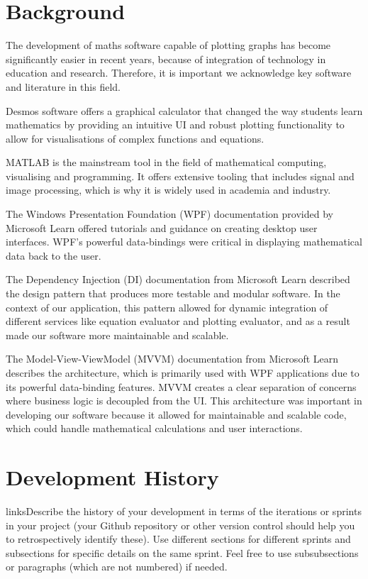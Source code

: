 \documentclass[a4paper, oneside, 11pt]{report}
\begin{document}
\chapter{Background}
The development of maths software capable of plotting graphs has become significantly easier in recent years, because of integration of technology in education and research. Therefore, it is important we acknowledge key software and literature in this field.

Desmos\cite{Desmos:2023} software offers a graphical calculator that changed the way students learn mathematics by providing an intuitive UI and robust plotting functionality to allow for visualisations of complex functions and equations.

MATLAB\cite{Matlab:2023} is the mainstream tool in the field of mathematical computing, visualising and programming. It offers extensive tooling that includes signal and image processing, which is why it is widely used in academia and industry.

The Windows Presentation Foundation (WPF)\cite{WPF:2023} documentation provided by Microsoft Learn offered tutorials and guidance on creating desktop user interfaces. WPF’s powerful data-bindings were critical in displaying mathematical data back to the user.

The Dependency Injection (DI) \cite{DI:2023} documentation from Microsoft Learn described the design pattern that produces more testable and modular software. In the context of our application, this pattern allowed for dynamic integration of different services like equation evaluator and plotting evaluator, and as a result made our software more maintainable and scalable.

The Model-View-ViewModel (MVVM)\cite{MVVM:2022} documentation from Microsoft Learn describes the architecture, which is primarily used with WPF applications due to its powerful data-binding features. MVVM creates a clear separation of concerns where business logic is decoupled from the UI. This architecture was important in developing our software because it allowed for maintainable and scalable code, which could handle mathematical calculations and user interactions.


\chapter{Development History}\label{Chap:DevHist}

linksDescribe the history of your development in terms of the iterations or sprints in your project (your Github repository or other version control should help you to retrospectively identify these). Use different sections for different sprints and subsections for specific details on the same sprint. Feel free to use subsubsections or paragraphs (which are not numbered) if needed. 
\end{document}
